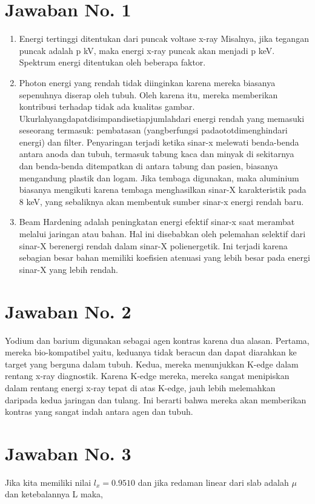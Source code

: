 \section{Jawaban No. 1}
\begin{enumerate}
\item Energi tertinggi ditentukan dari puncak voltase x-ray Misalnya, jika tegangan puncak adalah p kV, maka energi x-ray puncak akan menjadi p keV. Spektrum energi ditentukan oleh beberapa faktor. 
\item Photon energi yang rendah tidak diinginkan karena mereka biasanya sepenuhnya diserap oleh tubuh. Oleh karena itu, mereka memberikan kontribusi terhadap tidak ada kualitas gambar. Ukurlahyangdapatdisimpandisetiapjumlahdari energi rendah yang memasuki seseorang termasuk: pembatasan (yangberfungsi padaototdimenghindari energi) dan filter. Penyaringan terjadi ketika sinar-x melewati benda-benda antara anoda dan tubuh, termasuk tabung kaca dan minyak di sekitarnya dan benda-benda ditempatkan di antara tabung dan pasien, biasanya mengandung plastik dan logam. Jika tembaga digunakan, maka aluminium biasanya mengikuti karena tembaga menghasilkan sinar-X karakteristik pada 8 keV, yang sebaliknya akan membentuk sumber sinar-x energi rendah baru.
\item Beam Hardening adalah peningkatan energi efektif sinar-x saat merambat melalui jaringan atau bahan. Hal ini disebabkan oleh pelemahan selektif dari sinar-X berenergi rendah dalam sinar-X polienergetik. Ini terjadi karena sebagian besar bahan memiliki koefisien atenuasi yang lebih besar pada energi sinar-X yang lebih rendah.
\end{enumerate}

\section{Jawaban No. 2}
Yodium dan barium digunakan sebagai agen kontras karena dua alasan. Pertama, mereka bio-kompatibel yaitu, keduanya tidak beracun dan dapat diarahkan ke target yang berguna dalam tubuh. Kedua, mereka menunjukkan K-edge dalam rentang x-ray diagnostik. Karena K-edge mereka, mereka sangat menipiskan dalam rentang energi x-ray tepat di atas K-edge, jauh lebih melemahkan daripada kedua jaringan dan tulang. Ini berarti bahwa mereka akan memberikan kontras yang sangat indah antara agen dan tubuh.

\section{Jawaban No. 3}
Jika kita memiliki nilai $l_{x} = 0.9510$ dan jika redaman linear dari slab adalah $\mu$ dan ketebalannya L maka,

